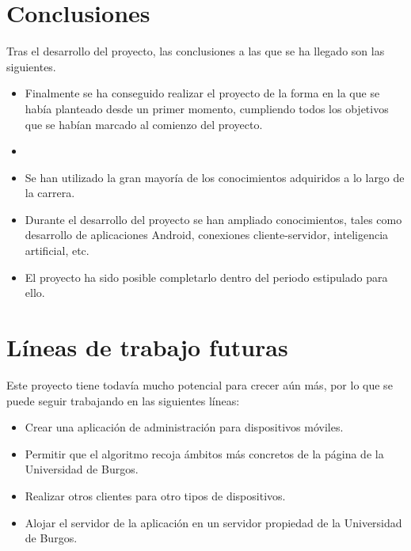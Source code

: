 
\section{Conclusiones}

Tras el desarrollo del proyecto, las conclusiones a las que se ha llegado son las siguientes.

\begin{itemize}
	\tightlist
	\item
	Finalmente se ha conseguido realizar el proyecto de la forma en la que se había planteado desde un primer momento, cumpliendo todos los objetivos que se habían marcado al comienzo del proyecto.
	\item 
	
	\item 
	Se han utilizado la gran mayoría de los conocimientos adquiridos a lo largo de la carrera.
	\item 
	Durante el desarrollo del proyecto se han ampliado conocimientos, tales como desarrollo de aplicaciones Android, conexiones cliente-servidor, inteligencia artificial, etc.
	\item 
	El proyecto ha sido posible completarlo dentro del periodo estipulado para ello.
\end{itemize}

\section{Líneas de trabajo futuras}

Este proyecto tiene todavía mucho potencial para crecer aún más, por lo que se puede seguir trabajando en las siguientes líneas:

\begin{itemize}
	\tightlist
	\item
	Crear una aplicación de administración para dispositivos móviles.
	\item 
	Permitir que el algoritmo recoja ámbitos más concretos de la página de la Universidad de Burgos.
	\item
	Realizar otros clientes para otro tipos de dispositivos.
	\item 
	Alojar el servidor de la aplicación en un servidor propiedad de la Universidad de Burgos.
\end{itemize}